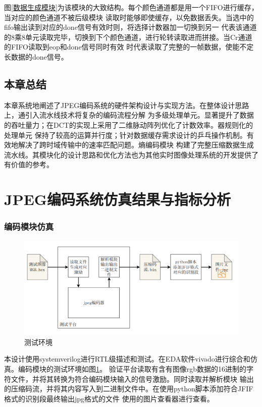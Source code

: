 \documentclass{article}
\numberwithin {equation}{section}
\begin{document}
\begin{spacing}{1.25}
    图\ref{数据生成模块}为该模块的大致结构。每个颜色通道都是用一个FIFO进行缓存，当对应的颜色通道不被后级模块
    读取时能够即使缓存，以免数据丢失。当选中的fifo输出读到对应的done信号有效时则，将选择计数器加一切换到另一
    代表该通道的8乘8单元读取完毕，切换到下个颜色通道，进行轮转读取进而拼接。当Cr通道的FIFO读取到eop和done信号同时有效
    时代表读取了完整的一帧数据，使能不定长数据的done信号。

  \subsection{本章总结}
    \vspace{1em}
    本章系统地阐述了JPEG编码系统的硬件架构设计与实现方法。在整体设计思路上，通引入流水线技术将复杂的编码流程分解
    为多级处理单元。显著提升了数据的吞吐量力；在DCT的实现上采用了二维脉动阵列优化了计数效率。器规则化的处理单元
    保持了较高的运算并行度；针对数据缓存需求设计的乒乓操作机制。有效地解决了跨时域传输中的速率匹配问题。熵编码模块
    构建了完整压缩数据生成流水线。其模块化的设计思路和优化方法也为其他实时图像处理系统的开发提供了有价值的参考。
  

\newpage
\section{JPEG编码系统仿真结果与指标分析}
  \vspace{1em}
  \subsubsection{编码模块仿真}
  \begin{figure}[H]
    \centering
    \includegraphics[scale=0.4]{./pictures/test_ele.png}
    \caption{测试环境}
    \label{test}
  \end{figure}
  本设计使用systemverilog进行RTL级描述和测试。在EDA软件vivado进行综合和仿真。编码模块的测试环境如图\ref{test}。
  验证平台读取有含有图像rgb数据的16进制的字符文件，并将其转换为符合编码模块输入的信号激励。同时读取并解析模块
  输出的压缩码流，并将其内容写入到二进制文件中。在使用python脚本添加符合JFIF格式的识别段最终输出jpg格式的文件
  使用的图片查看器进行查看。


\end{spacing}
\end{document}
